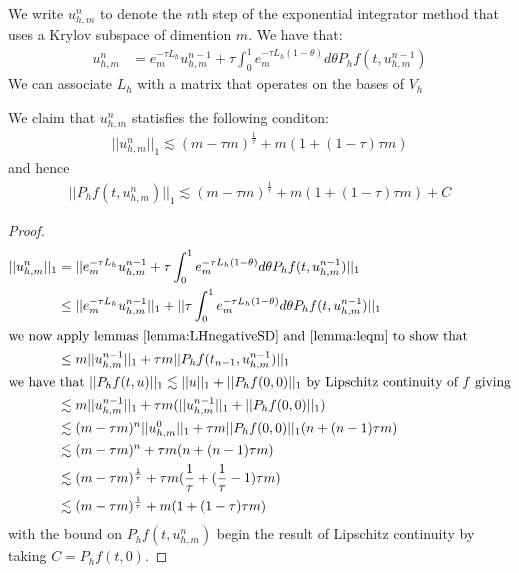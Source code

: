 \begin{definition}
    We write $u_{h,m}^n$ to denote the $n$th step of the exponential integrator method that uses a Krylov subspace of dimention $m$.
    We have that:
    \begin{align*}
        u_{h,m}^n &= e_m^{-\tau L_h} u_{h,m}^{n-1} + \tau \int^1_0e_m^{-\tau L_h(1-\theta)}d\theta P_hf(t, u_{h,m}^{n-1})
    \end{align*}
    We can associate $L_h$ with a matrix that operates on the bases of $V_h$
\end{definition}

\begin{lemma}
    We claim that $u_{h,m}^n$ statisfies the following conditon:
    \begin{align*}
        ||u_{h,m}^n||_1 \lesssim (m-\tau m)^\frac{1}{\tau} + m (1 + (1 - \tau)\tau m)
    \end{align*}
    and hence
    \begin{align*}
        ||P_hf(t,u_{h,m}^n)||_1 \lesssim (m-\tau m)^\frac{1}{\tau} + m (1 + (1 - \tau)\tau m) + C
    \end{align*}
\end{lemma}
\begin{proof}
    \begin{align*}
        ||u_{h,m}^n||_1 &= ||e_m^{-\tau L_h}u_{h,m}^{n-1} + \tau \int^1_0e_m^{-\tau L_h(1-\theta)}d\theta P_hf(t, u_{h,m}^{n-1})||_1\\
        &\leq ||e_m^{-\tau L_h}u_{h,m}^{n-1}||_1 + ||\tau \int^1_0e_m^{-\tau L_h(1-\theta)}d\theta P_hf(t, u_{h,m}^{n-1})||_1\\
        \intertext{we now apply lemmas \ref{lemma:LHnegativeSD} and \ref{lemma:leqm} to show that}
        &\leq m||u_{h,m}^{n-1}||_1 + \tau m ||P_hf(t_{n-1},u_{h,m}^{n-1})||_1\\
        \intertext{we have that $||P_hf(t,u)||_1 \lesssim ||u||_1+||P_hf(0,0)||_1$ by Lipschitz continuity of $f$ giving}
        &\lesssim m||u_{h,m}^{n-1}||_1 + \tau m (||u_{h,m}^{n-1}||_1 + ||P_hf(0,0)||_1)\\
        &\lesssim (m-\tau m)^n||u_{h,m}^0||_1 + \tau m ||P_hf(0,0)||_1(n + (n -1)\tau m)\\
        &\lesssim (m-\tau m)^n + \tau m (n + (n -1)\tau m)\\
        &\lesssim (m-\tau m)^\frac{1}{\tau} + \tau m (\frac{1}{\tau} + (\frac{1}{\tau} -1)\tau m)\\
        &\lesssim (m-\tau m)^\frac{1}{\tau} + m (1 + (1 - \tau)\tau m)
    \end{align*}
    with the bound on $P_hf(t,u_{h,m}^n)$ begin the result of Lipschitz continuity by taking $C=P_hf(t,0)$.
\end{proof}
